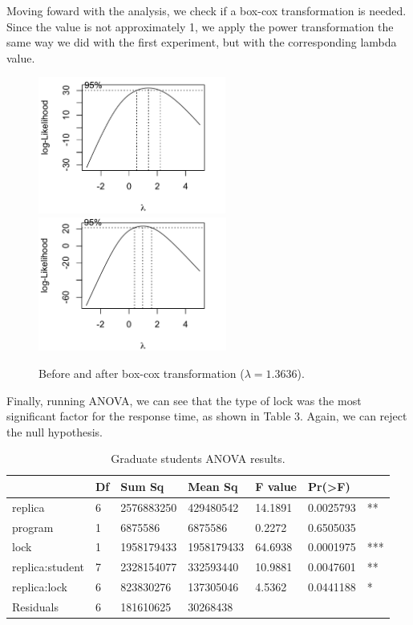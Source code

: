 Moving foward with the analysis, we check if a box-cox transformation is needed. Since the value is not approximately 1, we apply the power transformation the same way we did with the first experiment, but with the corresponding lambda value.

\begin{figure}
\includegraphics[height=4.5cm]{img/g2.png}
\hfill
\includegraphics[height=4.4cm]{img/g2boxcox.png}
\caption{Before and after box-cox transformation ($\lambda = 1.3636$).}
\end{figure}

Finally, running ANOVA, we can see that the type of lock was the most significant factor for the response time, as shown in Table 3. Again, we can reject the null hypothesis.

\begin{table}
\begin{center}
\caption{Graduate students ANOVA results.}
\begin{tabular}{|l|l|l|l|l|ll|}
\hline
                 & Df &    Sum Sq &   Mean Sq  & F value &   Pr(>F) & \\   
\hline
replica          & 6 & 2576883250 &  429480542 & 14.1891 & 0.0025793 & **  \\
program          & 1 &    6875586 &    6875586 &  0.2272 & 0.6505035 &     \\
lock             & 1 & 1958179433 & 1958179433 & 64.6938 & 0.0001975 & *** \\
replica:student  & 7 & 2328154077 &  332593440 & 10.9881 & 0.0047601 & **  \\
replica:lock     & 6 &  823830276 &  137305046 &  4.5362 & 0.0441188 & *   \\
Residuals        & 6 &  181610625 &   30268438 &         &           &     \\
\hline
\end{tabular}
\end{center}
\end{table}

